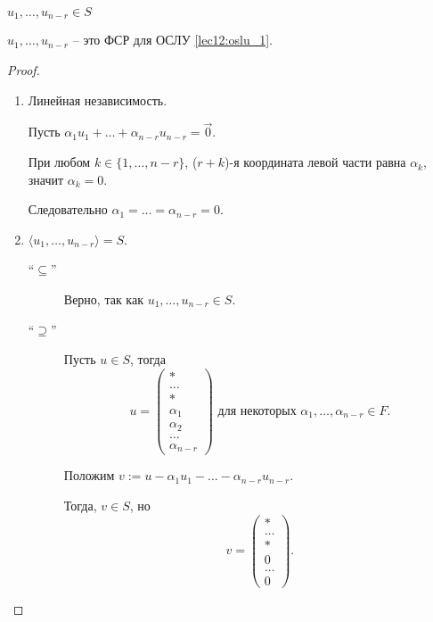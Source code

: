 \documentclass[a4paper]{article}
\begin{document}
\begin{colloq}
            $u_1, \dots, u_{n - r} \in S$

            \begin{proposal}
                $u_1, \dots, u_{n - r}$ -- это ФСР для ОСЛУ \eqref{lec12:oslu_1}.
            \end{proposal}

            \begin{proof}~
                \begin{enumerate}
                \item Линейная независимость.

                    Пусть $\alpha_1 u_1 + \dots + \alpha_{n - r} u_{n - r} = \overrightarrow{0}$.

                    При любом $k \in \{1, \dots, n - r\}$, ($r + k$)-я координата левой части равна $\alpha_k$, значит $\alpha_k = 0$.
                    
                    Следовательно $\alpha_1 = \dots = \alpha_{n - r} = 0$.

                \item $\langle u_1, \dots, u_{n - r} \rangle = S$.

                    \begin{description}
                    \item[``$\subseteq$'']
                        Верно, так как $u_1, \dots, u_{n - r} \in S$.

                    \item[``$\supseteq$'']
                        Пусть $u \in S$, тогда
                        \begin{equation*}
                            u = \begin{pmatrix} * \\ \dots \\ * \\ \alpha_1 \\ \alpha_2 \\ \dots \\ \alpha_{n - r} \end{pmatrix} \text{ для некоторых } \alpha_1, \dots, \alpha_{n - r} \in F
                        .\end{equation*}

                        Положим $v := u - \alpha_1 u_1 - \dots - \alpha_{n - r} u_{n - r}$.

                        Тогда, $v \in S$, но
                        \begin{equation*}
                            v = \begin{pmatrix} * \\ \dots \\ * \\ 0 \\ \dots \\ 0 \end{pmatrix}
                        .\end{equation*}


\end{description}
\end{enumerate}
\end{proof}
\end{colloq}
\end{document}
